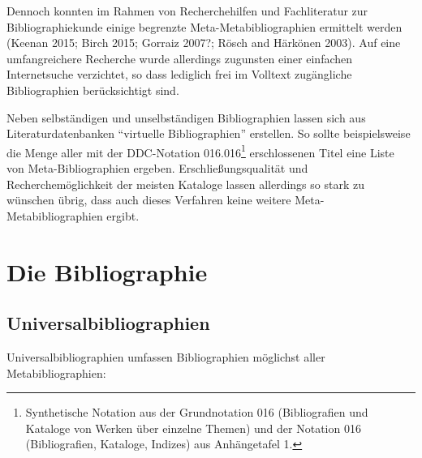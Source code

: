 \documentclass[a4paper,
fontsize=11pt,
oneside,
numbers=noperiodatend,
parskip=half-,
bibliography=totoc,
final
]{scrartcl}
\begin{document}
Dennoch konnten im Rahmen von Recherchehilfen und Fachliteratur zur
Bibliographiekunde einige begrenzte Meta-Metabibliographien ermittelt
werden (Keenan 2015; Birch 2015; Gorraiz 2007?; Rösch and Härkönen
2003). Auf eine umfangreichere Recherche wurde allerdings zugunsten
einer einfachen Internetsuche verzichtet, so dass lediglich frei im
Volltext zugängliche Bibliographien berücksichtigt sind.

Neben selbständigen und unselbständigen Bibliographien lassen sich aus
Literaturdatenbanken \enquote{virtuelle Bibliographien} erstellen. So
sollte beispielsweise die Menge aller mit der DDC-Notation
016.016\footnote{Synthetische Notation aus der Grundnotation 016
  (Bibliografien und Kataloge von Werken über einzelne Themen) und der
  Notation 016 (Bibliografien, Kataloge, Indizes) aus Anhängetafel 1.}
erschlossenen Titel eine Liste von Meta-Bibliographien ergeben.
Erschließ\-ungsqualität und Recherchemöglichkeit der meisten Kataloge
lassen allerdings so stark zu wünschen übrig, dass auch dieses Verfahren
keine weitere Meta-Metabibliographien ergibt.

\section*{Die Bibliographie}\label{die-bibliographie}

\subsection*{Universalbibliographien}\label{universalbibliographien}

Universalbibliographien umfassen Bibliographien möglichst aller
Metabibliographien:
\end{document}
